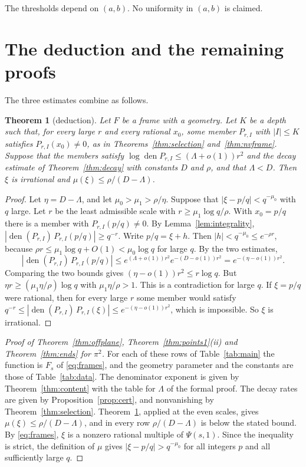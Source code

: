 \documentclass[11pt]{amsart}
\newtheorem{theorem}{Theorem}[section]
\theoremstyle{definition}
\theoremstyle{remark}
\numberwithin{equation}{section}
\newcommand{\den}{\operatorname{den}}
\begin{document}
The thresholds depend on $(a,b)$. No uniformity in $(a,b)$ is claimed.

\section{The deduction and the remaining proofs}\label{sec:proof}

The three estimates combine as follows.

\begin{theorem}[deduction]\label{thm:deduction}
Let $F$ be a frame with a geometry. Let $K$ be a depth such that, for every large $r$ and every rational $x_0$, some
member $P_{r,I}$ with $|I|\le K$ satisfies $P_{r,I}(x_0)\ne0$, as in Theorems~\ref{thm:selection} and~\ref{thm:nvframe}.
Suppose that the members satisfy $\log\den P_{r,I}\le(\Lambda+o(1))r^2$ and the decay estimate of
Theorem~\ref{thm:decay} with constants $D$ and $\rho$, and that $\Lambda<D$. Then $\xi$ is irrational and
$\mu(\xi)\le\rho/(D-\Lambda)$.
\end{theorem}

\begin{proof}
Let $\eta=D-\Lambda$, and let $\mu_0>\mu_1>\rho/\eta$. Suppose that $|\xi-p/q|<q^{-\mu_0}$ with $q$ large. Let $r$ be
the least admissible scale with $r\ge\mu_1\log q/\rho$. With $x_0=p/q$ there is a member with $P_{r,I}(p/q)\ne0$. By
Lemma~\ref{lem:integrality}, $|\den(P_{r,I})\,P_{r,I}(p/q)|\ge q^{-r}$. Write $p/q=\xi+h$.
Then $|h|<q^{-\mu_0}\le e^{-\rho r}$, because $\rho r\le\mu_1\log q+O(1)<\mu_0\log q$ for large $q$. By the two
estimates,
\[
 |\den(P_{r,I})\,P_{r,I}(p/q)|\le e^{(\Lambda+o(1))r^2}e^{-(D-o(1))r^2}=e^{-(\eta-o(1))r^2}.
\]
Comparing the two bounds gives $(\eta-o(1))r^2\le r\log q$. But $\eta r\ge(\mu_1\eta/\rho)\log q$ with
$\mu_1\eta/\rho>1$. This is a contradiction for large $q$. If $\xi=p/q$ were rational, then for every large $r$ some member would satisfy
$q^{-r}\le|\den(P_{r,I})\,P_{r,I}(\xi)|\le e^{-(\eta-o(1))r^2}$, which is impossible. So $\xi$ is irrational.
\end{proof}

\begin{proof}[Proof of Theorem~\ref{thm:offplane}, Theorem~\ref{thm:points1}(ii) and Theorem~\ref{thm:ends} for $\pi^2$]
For each of these rows of Table~\ref{tab:main} the function is $F_s$ of \eqref{eq:frames}, and the geometry parameter and
the constants are those of Table~\ref{tab:data}. The denominator exponent is given by Theorem~\ref{thm:content} with the
table for $\Lambda$ of the formal proof. The decay rates are given by Proposition~\ref{prop:cert}, and nonvanishing by
Theorem~\ref{thm:selection}. Theorem~\ref{thm:deduction}, applied at the even scales, gives $\mu(\xi)\le\rho/(D-\Lambda)$,
and in every row $\rho/(D-\Lambda)$ is below the stated bound. By \eqref{eq:frames}, $\xi$ is a nonzero rational multiple
of $\Psi(s,1)$. Since the inequality is strict, the definition of $\mu$ gives $|\xi-p/q|>q^{-\mu_0}$ for all integers $p$
and all sufficiently large $q$.
\end{proof}
\end{document}
